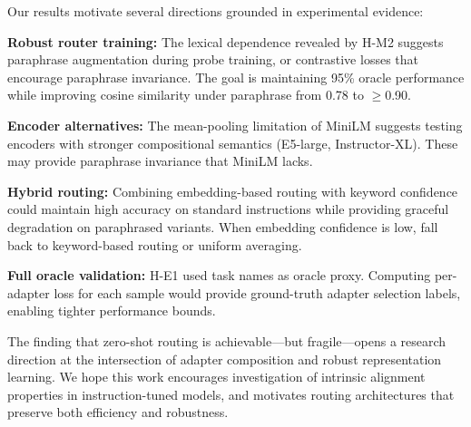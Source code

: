 Our results motivate several directions grounded in experimental evidence:

\textbf{Robust router training:} The lexical dependence revealed by H-M2 suggests paraphrase augmentation during probe training, or contrastive losses that encourage paraphrase invariance. The goal is maintaining 95\% oracle performance while improving cosine similarity under paraphrase from 0.78 to $\geq$0.90.

\textbf{Encoder alternatives:} The mean-pooling limitation of MiniLM suggests testing encoders with stronger compositional semantics (E5-large, Instructor-XL). These may provide paraphrase invariance that MiniLM lacks.

\textbf{Hybrid routing:} Combining embedding-based routing with keyword confidence could maintain high accuracy on standard instructions while providing graceful degradation on paraphrased variants. When embedding confidence is low, fall back to keyword-based routing or uniform averaging.

\textbf{Full oracle validation:} H-E1 used task names as oracle proxy. Computing per-adapter loss for each sample would provide ground-truth adapter selection labels, enabling tighter performance bounds.

The finding that zero-shot routing is achievable---but fragile---opens a research direction at the intersection of adapter composition and robust representation learning. We hope this work encourages investigation of intrinsic alignment properties in instruction-tuned models, and motivates routing architectures that preserve both efficiency and robustness.
